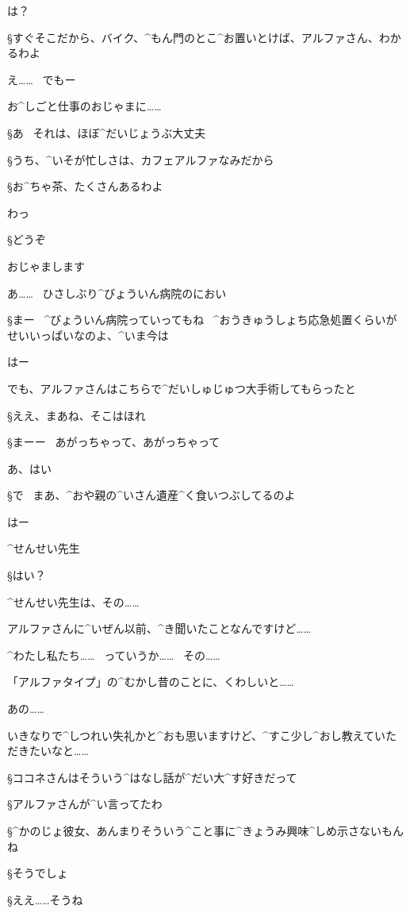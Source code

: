 \K は？

\S すぐそこだから、バイク、^{もん}{門}のとこ^{お}{置}いとけば、アルファさん、わかるわよ

\K え……
\ でもー

\K お^{しごと}{仕事}のおじゃまに……

\S あ
\ それは、ほぼ^{だいじょうぶ}{大丈夫}

\page
\S うち、^{いそが}{忙}しさは、カフェアルファなみだから

\S お^{ちゃ}{茶}、たくさんあるわよ

\K わっ

\page
\S どうぞ

\K おじゃまします

\K あ……
\ ひさしぶり^{びょういん}{病院}のにおい

\S まー
\ ^{びょういん}{病院}っていってもね
\ ^{おうきゅうしょち}{応急処置}くらいがせいいっぱいなのよ、^{いま}{今}は

\K はー

\K でも、アルファさんはこちらで^{だいしゅじゅつ}{大手術}してもらったと

\S ええ、まあね、そこはほれ

\S まーー
\ あがっちゃって、あがっちゃって

\K あ、はい

\page
\S で
\ まあ、^{おや}{親}の^{いさん}{遺産}^{く}{食}いつぶしてるのよ

\K はー

\K ^{せんせい}{先生}

\S はい？

\K ^{せんせい}{先生}は、その……

\K アルファさんに^{いぜん}{以前}、^{き}{聞}いたことなんですけど……

\page
\K ^{わたし}{私}たち……
\ っていうか……
\ その……

\K 「アルファタイプ」の^{むかし}{昔}のことに、くわしいと……

\K あの……

\K いきなりで^{しつれい}{失礼}かと^{おも}{思}いますけど、^{すこ}{少}し^{おし}{教}えていただきたいなと……

\S ココネさんはそういう^{はなし}{話}が^{だい}{大}^{す}{好}きだって

\S アルファさんが^{い}{言}ってたわ

\page
\S ^{かのじょ}{彼女}、あんまりそういう^{こと}{事}に^{きょうみ}{興味}^{しめ}{示}さないもんね

\S そうでしょ

\S ええ……そうね

